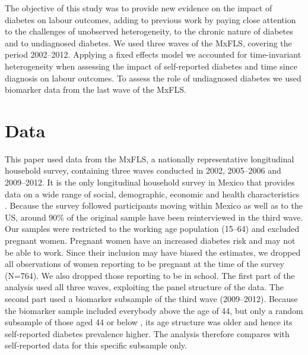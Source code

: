 \documentclass[12pt,english]{article}
\begin{document}
The objective of this study was to provide new evidence on the impact of diabetes on labour outcomes, adding to previous work by paying close attention to the challenges of unobserved heterogeneity, to the chronic nature of diabetes and to undiagnosed diabetes. We used three waves of the \ac{MxFLS}, covering the period 2002--2012. Applying a fixed effects model we accounted for time-invariant heterogeneity when assessing the impact of self-reported diabetes and time since diagnosis on labour outcomes. To assess the role of undiagnosed diabetes we used biomarker data from the last wave of the \ac{MxFLS}.

\section{\label{sec:Data}Data}

This paper used data from the \acf{MxFLS}, a nationally representative longitudinal household survey, containing three waves conducted in 2002, 2005--2006 and 2009--2012. It is the only longitudinal household survey in Mexico that provides data on a wide range of social, demographic, economic and health characteristics \parencite{Rubalcava2013}. Because the survey followed participants moving within Mexico as well as to the US, around 90\% of the original sample have been reinterviewed in the third wave. Our samples were restricted to the working age population (15--64) and excluded pregnant women. Pregnant women have an increased diabetes risk and may not be able to work. Since their inclusion may have biased the estimates, we dropped all observations of women reporting to be pregnant at the time of the survey (N=764). We also dropped those reporting to be in school. The first part of the analysis used all three waves, exploiting the panel structure of the data. The second part used a biomarker subsample of the third wave (2009--2012). Because the biomarker sample included everybody above the age of 44, but only a random subsample of those aged 44 or below \parencite{Crimmins2015}, its age structure was older and hence its self-reported diabetes prevalence higher. The analysis therefore compares with self-reported data for this specific subsample only.
\end{document}
